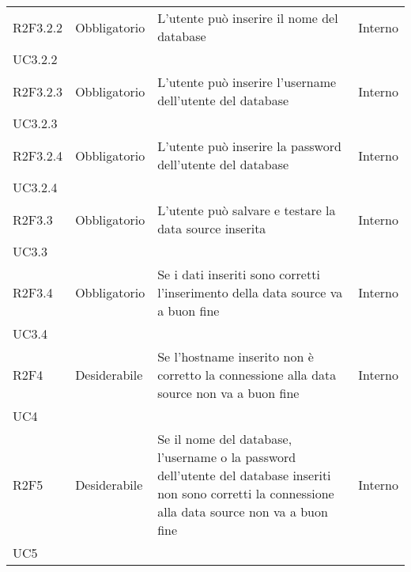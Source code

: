 \begin{longtable} {
		>{\centering}p{24mm} 
		>{\centering}p{32mm}
		>{\centering}p{40mm} 
		>{}p{24.5mm}
		}
		R2F3.2.2 & Obbligatorio & L'utente può inserire il nome del database & Interno\\UC3.2.2 \TBstrut \\ [2mm]
        R2F3.2.3 & Obbligatorio & L'utente può inserire l'username dell'utente del database & Interno\\UC3.2.3 \TBstrut \\ [2mm]
        R2F3.2.4 & Obbligatorio & L'utente può inserire la password dell'utente del database & Interno\\UC3.2.4 \TBstrut \\ [2mm]
		R2F3.3 & Obbligatorio & L'utente può salvare e testare la data source inserita & Interno\\UC3.3 \TBstrut \\ [2mm]
		R2F3.4 & Obbligatorio & Se i dati inseriti sono corretti l'inserimento della data source va a buon fine & Interno\\UC3.4 \TBstrut \\ [2mm]
        R2F4 & Desiderabile & Se l'hostname inserito non è corretto la connessione alla data source non va a buon fine & Interno\\UC4 \TBstrut \\ [2mm]
        R2F5 & Desiderabile & Se il nome del database, l'username o la password dell'utente del database inseriti non sono corretti la connessione alla data source non va a buon fine & Interno\\UC5 \TBstrut \\ [2mm]
	\end{longtable}